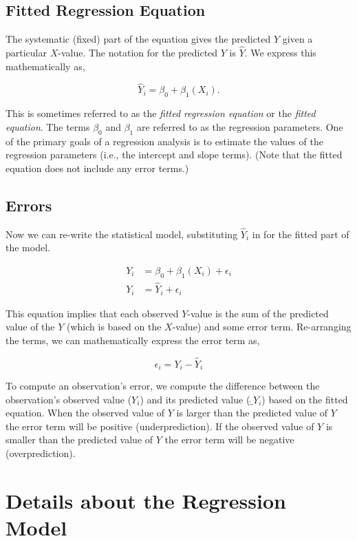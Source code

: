 \documentclass[]{book}
\theoremstyle{definition}
\theoremstyle{definition}
\theoremstyle{definition}
\theoremstyle{remark}
\begin{document}
\hypertarget{fitted-regression-equation}{%
\subsection{Fitted Regression
Equation}\label{fitted-regression-equation}}

The systematic (fixed) part of the equation gives the predicted \(Y\)
given a particular \(X\)-value. The notation for the predicted \(Y\) is
\(\hat{Y}\). We express this mathematically as,

\[
\hat{Y}_i = \beta_0 + \beta_1(X_i).
\]

This is sometimes referred to as the \emph{fitted regression equation}
or the \emph{fitted equation}. The terms \(\beta_0\) and \(\beta_1\) are
referred to as the regression parameters. One of the primary goals of a
regression analysis is to estimate the values of the regression
parameters (i.e., the intercept and slope terms). (Note that the fitted
equation does not include any error terms.)

\hypertarget{errors}{%
\subsection{Errors}\label{errors}}

Now we can re-write the statistical model, substituting \(\hat{Y}_i\) in
for the fitted part of the model.

\[
\begin{split}
Y_i &= \beta_0 + \beta_1(X_i) + \epsilon_i \\
Y_i &= \hat{Y}_i + \epsilon_i 
\end{split}
\]

This equation implies that each observed \(Y\)-value is the sum of the
predicted value of the \(Y\) (which is based on the \(X\)-value) and
some error term. Re-arranging the terms, we can mathematically express
the error term as,

\[
\epsilon_i = Y_i - \hat{Y}_i
\]

To compute an observation's error, we compute the difference between the
observation's observed value (\(Y_i\)) and its predicted value
(\(\hat_{Y}_i\)) based on the fitted equation. When the observed value
of \(Y\) is larger than the predicted value of \(Y\) the error term will
be positive (underprediction). If the observed value of \(Y\) is smaller
than the predicted value of \(Y\) the error term will be negative
(overprediction).

\hypertarget{details-about-the-regression-model}{%
\section{Details about the Regression
Model}\label{details-about-the-regression-model}}
\end{document}
